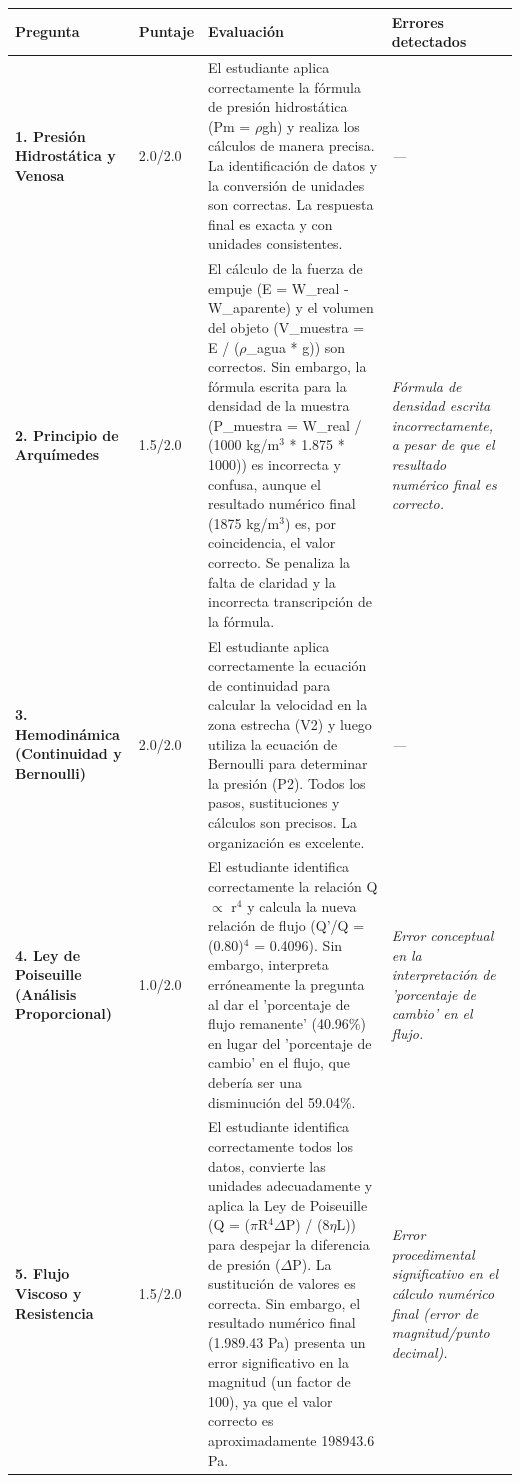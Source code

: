 \documentclass[11pt,a4paper]{article}
\begin{document}
\begin{longtable}{>{\bfseries}p{2.8cm} p{1.6cm} p{7.0cm} p{2.8cm}}
  \toprule
  \textbf{Pregunta} & \textbf{Puntaje} & \textbf{Evaluación} & \textbf{Errores detectados} \\
  \midrule
  \endhead
  \bottomrule
  \endfoot
    \textbf{1. Presión Hidrostática y Venosa} & 2.0/2.0 & El estudiante aplica correctamente la fórmula de presión hidrostática (Pm = $\rho$gh) y realiza los cálculos de manera precisa. La identificación de datos y la conversión de unidades son correctas. La respuesta final es exacta y con unidades consistentes. & \textit{---} \\
    \midrule
    \textbf{2. Principio de Arquímedes} & 1.5/2.0 & El cálculo de la fuerza de empuje (E = W\_real - W\_aparente) y el volumen del objeto (V\_muestra = E / ($\rho$\_agua * g)) son correctos. Sin embargo, la fórmula escrita para la densidad de la muestra (P\_muestra = W\_real / (1000 kg/m$^{3}$ * 1.875 * 1000)) es incorrecta y confusa, aunque el resultado numérico final (1875 kg/m$^{3}$) es, por coincidencia, el valor correcto. Se penaliza la falta de claridad y la incorrecta transcripción de la fórmula. & \textit{Fórmula de densidad escrita incorrectamente, a pesar de que el resultado numérico final es correcto.} \\
    \midrule
    \textbf{3. Hemodinámica (Continuidad y Bernoulli)} & 2.0/2.0 & El estudiante aplica correctamente la ecuación de continuidad para calcular la velocidad en la zona estrecha (V2) y luego utiliza la ecuación de Bernoulli para determinar la presión (P2). Todos los pasos, sustituciones y cálculos son precisos. La organización es excelente. & \textit{---} \\
    \midrule
    \textbf{4. Ley de Poiseuille (Análisis Proporcional)} & 1.0/2.0 & El estudiante identifica correctamente la relación Q $\propto$ r$^{4}$ y calcula la nueva relación de flujo (Q'/Q = (0.80)$^{4}$ = 0.4096). Sin embargo, interpreta erróneamente la pregunta al dar el 'porcentaje de flujo remanente' (40.96\%) en lugar del 'porcentaje de cambio' en el flujo, que debería ser una disminución del 59.04\%. & \textit{Error conceptual en la interpretación de 'porcentaje de cambio' en el flujo.} \\
    \midrule
    \textbf{5. Flujo Viscoso y Resistencia} & 1.5/2.0 & El estudiante identifica correctamente todos los datos, convierte las unidades adecuadamente y aplica la Ley de Poiseuille (Q = ($\pi$R$^{4}$$\Delta$P) / (8$\eta$L)) para despejar la diferencia de presión ($\Delta$P). La sustitución de valores es correcta. Sin embargo, el resultado numérico final (1.989.43 Pa) presenta un error significativo en la magnitud (un factor de 100), ya que el valor correcto es aproximadamente 198943.6 Pa. & \textit{Error procedimental significativo en el cálculo numérico final (error de magnitud/punto decimal).} \\
    \midrule
\end{longtable}
\end{document}
